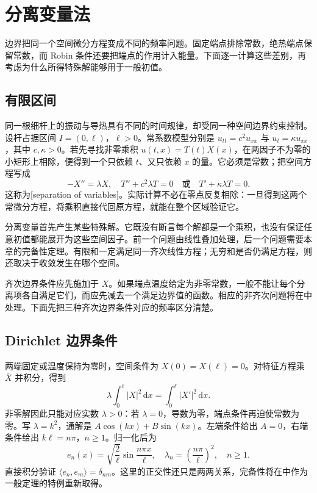 \section{分离变量法}
\label{b2:sec:1001}

边界把同一个空间微分方程变成不同的频率问题。固定端点排除常数，绝热端点保留常数，而 Robin 条件还要把端点的作用计入能量。下面逐一计算这些差别，再考虑为什么所得特殊解能够用于一般初值。

\subsection{有限区间}
\label{b2:subsec:100101}

同一根细杆上的振动与导热具有不同的时间规律，却受同一种空间边界约束控制。设杆占据区间 \(I=(0,\ell)\)，\(\ell>0\)。常系数模型分别是 \(u_{tt}=c^2u_{xx}\) 与 \(u_t=\kappa u_{xx}\)，其中 \(c,\kappa>0\)。若先寻找非零乘积 \(u(t,x)=T(t)X(x)\)，在两因子不为零的小矩形上相除，便得到一个只依赖 \(t\)、又只依赖 \(x\) 的量。它必须是常数；把空间方程写成
\[
 -X''=\lambda X,
 \quad T''+c^2\lambda T=0
 \quad\text{或}\quad T'+\kappa\lambda T=0.
\]
这称为[separation of variables]。实际计算不必在零点反复相除：一旦得到这两个常微分方程，将乘积直接代回原方程，就能在整个区域验证它。

\ProseParagraphBreak

分离变量首先产生某些特殊解。它既没有断言每个解都是一个乘积，也没有保证任意初值都能展开为这些空间因子。前一个问题由线性叠加处理，后一个问题需要本章的完备性定理。有限和一定满足同一齐次线性方程；无穷和是否仍满足方程，则还取决于收敛发生在哪个空间。

\ProseParagraphBreak

齐次边界条件应先施加于 \(X\)。如果端点温度给定为非零常数，一般不能让每个分离项各自满足它们，而应先减去一个满足边界值的函数。相应的非齐次问题将在中处理。下面先把三种齐次边界条件对应的频率区分清楚。

\subsection{Dirichlet 边界条件}
\label{b2:subsec:100102}

两端固定或温度保持为零时，空间条件为 \(X(0)=X(\ell)=0\)。对特征方程乘 \(\overline X\) 并积分，得到
\[
 \lambda\int_0^\ell |X|^2\,\mathrm{d}x
 =\int_0^\ell |X'|^2\,\mathrm{d}x.
\]
非零解因此只能对应实数 \(\lambda>0\)：若 \(\lambda=0\)，导数为零，端点条件再迫使常数为零。写 \(\lambda=k^2\)，通解是 \(A\cos(kx)+B\sin(kx)\)。左端条件给出 \(A=0\)，右端条件给出 \(k\ell=n\pi\)，\(n\geq1\)。归一化后为
\begin{equation}\label{b2:eq:10-dirichlet-modes}
 e_n(x)=\sqrt{\dfrac2\ell}\sin\dfrac{n\pi x}{\ell},
 \quad\lambda_n=\left(\dfrac{n\pi}{\ell}\right)^2,
 \quad n\geq1.
\end{equation}
直接积分验证 \(\langle e_n,e_m\rangle=\delta_{nm}\)。这里的正交性还只是两两关系，完备性将在中作为一般定理的特例重新取得。

